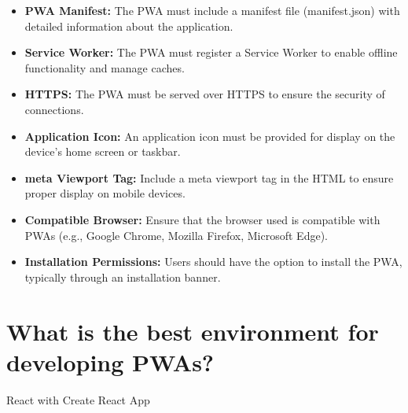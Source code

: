 \documentclass{report}
\begin{document}
\begin{itemize}
\item \textbf{PWA Manifest:} The PWA must include a manifest file (manifest.json) with detailed information about the application.
\item \textbf{Service Worker:} The PWA must register a Service Worker to enable offline functionality and manage caches.
\item \textbf{HTTPS:} The PWA must be served over HTTPS to ensure the security of connections.
\item \textbf{Application Icon:} An application icon must be provided for display on the device's home screen or taskbar.
\item \textbf{meta Viewport Tag:} Include a meta viewport tag in the HTML to ensure proper display on mobile devices.
\item \textbf{Compatible Browser:} Ensure that the browser used is compatible with PWAs (e.g., Google Chrome, Mozilla Firefox, Microsoft Edge).
\item \textbf{Installation Permissions:} Users should have the option to install the PWA, typically through an installation banner.
\end{itemize}

\section{What is the best environment for developing PWAs?}

React with Create React App
\end{document}
